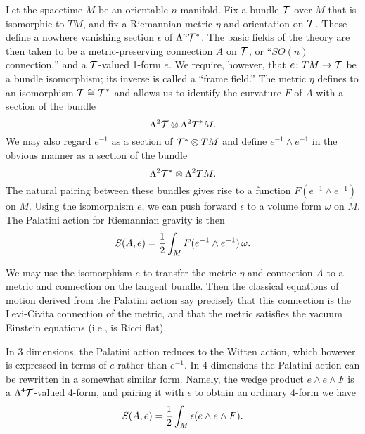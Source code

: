 \documentclass[12pt]{article}
\newcommand{\eps}{\epsilon}
\newcommand{\om}{\omega}
\newcommand{\tensor}{\otimes}
\newcommand{\maps}{\colon}
\newcommand{\T}{{\cal T}}
\newcommand{\hf}{{1\over 2}}
\newcommand{\iso}{\cong}
\begin{document}
Let the spacetime $M$ be an orientable $n$-manifold.    Fix a bundle $\T$
over $M$ that is isomorphic to $TM$, and fix a Riemannian metric $\eta$ and
orientation on $\T$.   These define a nowhere vanishing section $\eps$ of
$\Lambda^n \T^\ast$.   The basic fields of the theory are then taken to be
a metric-preserving connection $A$ on $\T$, or ``$SO(n)$ connection,'' and
a $\T$-valued 1-form $e$.  We require, however, that $e \maps TM \to \T$ be
a bundle isomorphism; its inverse is called a ``frame field.''  The metric
$\eta$ defines to an isomorphism $\T \iso \T^\ast$ and allows us to identify
the curvature $F$ of $A$ with a section of the bundle
\[         \Lambda^2 \T \tensor \Lambda^2 T^\ast M .\]
We may also regard $e^{-1}$ as a section of $\T^\ast \tensor TM$ and define
$e^{-1} \wedge e^{-1}$ in the obvious manner as a section of the bundle
\[          \Lambda^2 \T^\ast \tensor \Lambda^2 TM .\]
The natural pairing between these bundles gives rise to a function
$F(e^{-1} \wedge e^{-1})$ on $M$.
Using the isomorphism $e$, we can push forward $\eps$
to a volume form $\om$ on $M$.
The Palatini action for Riemannian gravity is then
\[        S(A,e) = \hf \int_M F(e^{-1} \wedge e^{-1})\, \om .\]

We may use the isomorphism $e$ to transfer the metric $\eta$ and
connection $A$ to a metric and connection on the tangent bundle.  Then the
classical equations of motion derived from the Palatini action say
precisely that this connection is the Levi-Civita connection of the metric,
and that the metric satisfies the vacuum Einstein equations (i.e., is Ricci
flat).

In 3 dimensions, the Palatini action reduces to the Witten action, which
however is expressed in terms of $e$ rather than $e^{-1}$.   In 4
dimensions the Palatini action can be rewritten in a somewhat similar form.
Namely, the wedge product $e \wedge e \wedge F$ is a $\Lambda^4 \T$-valued
4-form, and pairing it with $\eps$ to obtain an ordinary 4-form we have
\[       S(A,e) = \hf\int_M \eps(e \wedge e \wedge F) .\]
\end{document}

